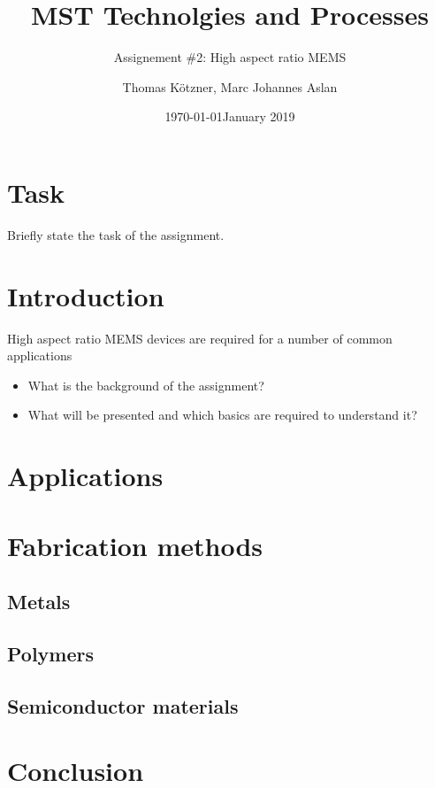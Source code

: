 \documentclass[a4paper,
  twoside, %
  headlines=2.1 %
  ]{scrartcl}
\author{\yourname}
\title{\lecture}
\title{MST Technolgies and Processes}
\subtitle{Assignement \#2: High aspect ratio MEMS}
\date{\today}
\author{Thomas Kötzner, Marc Johannes Aslan}
\date{January 2019}
\begin{document}
\maketitle

\section{Task}
Briefly state the task of the assignment.
\section{Introduction}
High aspect ratio MEMS devices are required for a number of common applications
\begin{itemize}
    \item What is the background of the assignment?
    \item What will be presented and which basics are required to understand it?
\end{itemize}
\section{Applications}
\section{Fabrication methods}
\subsection{Metals}
\subsection{Polymers}
\subsection{Semiconductor materials}

\section{Conclusion}
\end{document}
